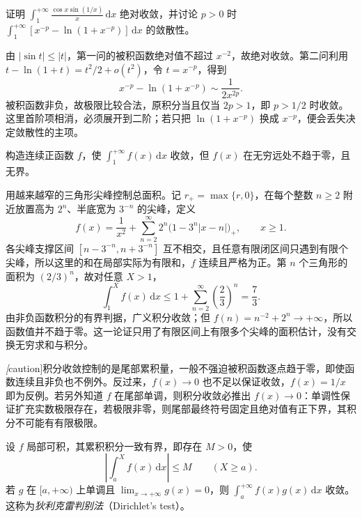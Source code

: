 \begin{example}
\label{ex:absolute-comparison-and-log-cancellation}
证明 $\int_1^{+\infty}\frac{\cos x\sin(1/x)}x\,\mathrm{d}x$ 绝对收敛，并讨论 $p>0$ 时 $\int_1^{+\infty}[x^{-p}-\ln(1+x^{-p})]\,\mathrm{d}x$ 的敛散性。
\end{example}

\begin{solve}
由 $|\sin t|\leq|t|$，第一问的被积函数绝对值不超过 $x^{-2}$，故绝对收敛。第二问利用 $t-\ln(1+t)=t^2/2+o(t^2)$，令 $t=x^{-p}$，得到
\[
    x^{-p}-\ln(1+x^{-p})\sim\frac1{2x^{2p}}.
\]
被积函数非负，故极限比较合法，原积分当且仅当 $2p>1$，即 $p>1/2$ 时收敛。这里首阶项相消，必须展开到二阶；若只把 $\ln(1+x^{-p})$ 换成 $x^{-p}$，便会丢失决定敛散性的主项。
\end{solve}

\begin{example}
\label{ex:continuous-integrable-spikes}
构造连续正函数 $f$，使 $\int_1^{+\infty}f(x)\,\mathrm{d}x$ 收敛，但 $f(x)$ 在无穷远处不趋于零，且无界。
\end{example}

\begin{solve}
用越来越窄的三角形尖峰控制总面积。记 $r_+=\max\{r,0\}$，在每个整数 $n\geq2$ 附近放置高为 $2^n$、半底宽为 $3^{-n}$ 的尖峰，定义
\[
    f(x)=\frac1{x^2}
       +\sum_{n=2}^{\infty}2^n\bigl(1-3^n|x-n|\bigr)_+,
    \qquad x\geq1.
\]
各尖峰支撑区间 $[n-3^{-n},n+3^{-n}]$ 互不相交，且任意有限闭区间只遇到有限个尖峰，所以这里的和在局部实际为有限和，$f$ 连续且严格为正。第 $n$ 个三角形的面积为 $(2/3)^n$，故对任意 $X>1$，
\[
    \int_1^X f(x)\,\mathrm{d}x
    \leq1+\sum_{n=2}^{\infty}\left(\frac23\right)^n
    =\frac73.
\]
由非负函数积分的有界判据，广义积分收敛；但 $f(n)=n^{-2}+2^n\to+\infty$，所以函数值并不趋于零。这一论证只用了有限区间上有限多个尖峰的面积估计，没有交换无穷求和与积分。
\end{solve}

\emph[caution]{积分收敛控制的是尾部累积量，一般不强迫被积函数逐点趋于零，即使函数连续且非负也不例外。}反过来，$f(x)\to0$ 也不足以保证收敛，$f(x)=1/x$ 即为反例。若另外知道 $f$ 在尾部单调，则积分收敛必推出 $f(x)\to0$：单调性保证扩充实数极限存在，若极限非零，则尾部最终符号固定且绝对值有正下界，其积分不可能有有限极限。

\begin{theorem}[狄利克雷判别法]
\label{thm:dirichlet-test-infinite-integrals}
设 $f$ 局部可积，其累积积分一致有界，即存在 $M>0$，使
\[
    \left|\int_a^X f(x)\,\mathrm{d}x\right|\leq M
    \qquad(X\geq a).
\]
若 $g$ 在 $[a,+\infty)$ 上单调且 $\lim_{x\to+\infty}g(x)=0$，则 $\int_a^{+\infty}f(x)g(x)\,\mathrm{d}x$ 收敛。这称为\emph{狄利克雷判别法}（Dirichlet's test）。
\end{theorem}

